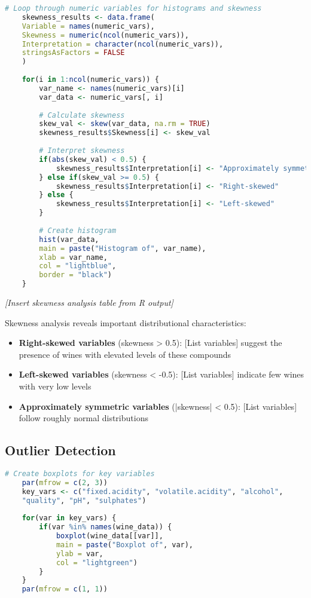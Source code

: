 \begin{lstlisting}[language=R, caption=Skewness Analysis and Visualization]
	# Loop through numeric variables for histograms and skewness
	skewness_results <- data.frame(
	Variable = names(numeric_vars),
	Skewness = numeric(ncol(numeric_vars)),
	Interpretation = character(ncol(numeric_vars)),
	stringsAsFactors = FALSE
	)
	
	for(i in 1:ncol(numeric_vars)) {
		var_name <- names(numeric_vars)[i]
		var_data <- numeric_vars[, i]
		
		# Calculate skewness
		skew_val <- skew(var_data, na.rm = TRUE)
		skewness_results$Skewness[i] <- skew_val
		
		# Interpret skewness
		if(abs(skew_val) < 0.5) {
			skewness_results$Interpretation[i] <- "Approximately symmetric"
		} else if(skew_val >= 0.5) {
			skewness_results$Interpretation[i] <- "Right-skewed"
		} else {
			skewness_results$Interpretation[i] <- "Left-skewed"
		}
		
		# Create histogram
		hist(var_data, 
		main = paste("Histogram of", var_name),
		xlab = var_name,
		col = "lightblue",
		border = "black")
	}
\end{lstlisting}

\textit{[Insert skewness analysis table from R output]}

Skewness analysis reveals important distributional characteristics:

\begin{itemize}
	\item \textbf{Right-skewed variables} (skewness > 0.5): [List variables] suggest the presence of wines with elevated levels of these compounds
	\item \textbf{Left-skewed variables} (skewness < -0.5): [List variables] indicate few wines with very low levels
	\item \textbf{Approximately symmetric variables} (|skewness| < 0.5): [List variables] follow roughly normal distributions
\end{itemize}

\subsection{Outlier Detection}

\begin{lstlisting}[language=R, caption=Outlier Detection using Boxplots]
	# Create boxplots for key variables
	par(mfrow = c(2, 3))
	key_vars <- c("fixed.acidity", "volatile.acidity", "alcohol", 
	"quality", "pH", "sulphates")
	
	for(var in key_vars) {
		if(var %in% names(wine_data)) {
			boxplot(wine_data[[var]], 
			main = paste("Boxplot of", var),
			ylab = var,
			col = "lightgreen")
		}
	}
	par(mfrow = c(1, 1))
\end{lstlisting}

